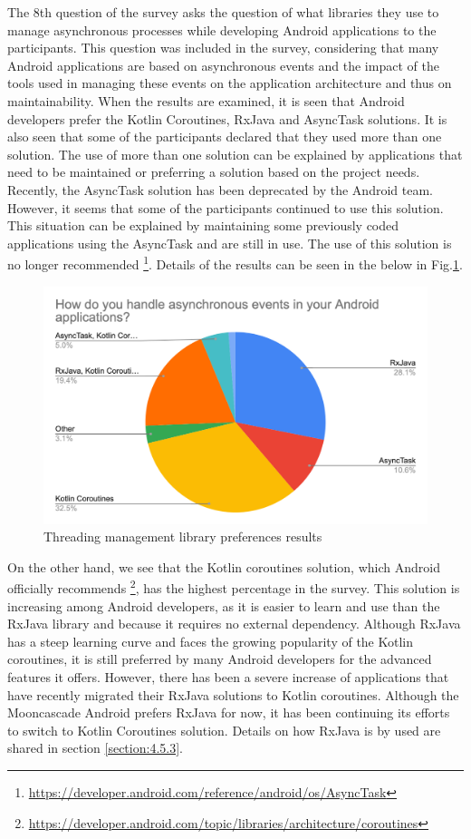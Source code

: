 The 8th question of the survey asks the question of what libraries they use to manage asynchronous processes while developing Android applications to the participants. This question was included in the survey, considering that many Android applications are based on asynchronous events and the impact of the tools used in managing these events on the application architecture and thus on maintainability. When the results are examined, it is seen that Android developers prefer the Kotlin Coroutines, RxJava and AsyncTask solutions. It is also seen that some of the participants declared that they used more than one solution. The use of more than one solution can be explained by applications that need to be maintained or preferring a solution based on the project needs. Recently, the AsyncTask solution has been deprecated by the Android team. However, it seems that some of the participants continued to use this solution. This situation can be explained by maintaining some previously coded applications using the AsyncTask and are still in use. The use of this solution is no longer recommended \footnote{\url{https://developer.android.com/reference/android/os/AsyncTask}}. Details of the results can be seen in the below in Fig.\ref{fig:async_events}.
\begin{figure}[ht!]
    \centering
    \includegraphics[scale=0.25]{figures/async_events.png}
    \caption{Threading management library preferences results}
    \label{fig:async_events}
\end{figure}
\FloatBarrier

On the other hand, we see that the Kotlin coroutines solution, which Android officially recommends \footnote{\url{https://developer.android.com/topic/libraries/architecture/coroutines}}, has the highest percentage in the survey. This solution is increasing among Android developers, as it is easier to learn and use than the RxJava library and because it requires no external dependency. Although RxJava has a steep learning curve and faces the growing popularity of the Kotlin coroutines, it is still preferred by many Android developers for the advanced features it offers. However, there has been a severe increase of applications that have recently migrated their RxJava solutions to Kotlin coroutines\cite{42}. Although the Mooncascade Android prefers RxJava for now, it has been continuing its efforts to switch to Kotlin Coroutines solution. Details on how RxJava is by used are shared in section \ref{section:4.5.3}.


